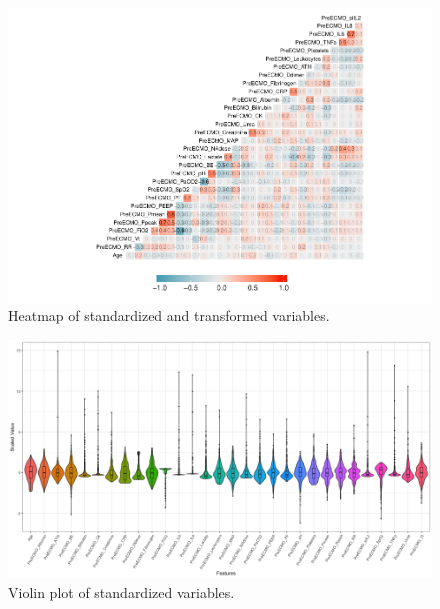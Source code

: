 \documentclass[12pt,]{article}
\begin{document}
\begin{figure}[H]

{\centering \includegraphics[width=1\linewidth]{figure/graphics-heatmap-standardized-1} 

}

\caption{\label{fig.ensemble-imputation}Heatmap of standardized and transformed variables.}\label{fig:heatmap-standardized}
\end{figure}

\begin{figure}[H]

{\centering \includegraphics[width=1\linewidth]{images/violinplot} 

}

\caption{\label{fig.ensemble-imputation}Violin plot of standardized variables.}\label{fig:violin}
\end{figure}
\end{document}
